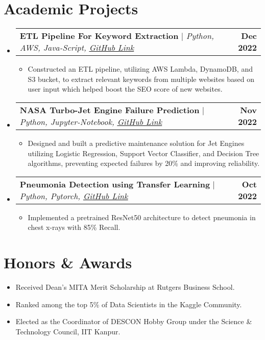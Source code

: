 \documentclass[letterpaper,11pt]{article}
\makeatletter
\newcommand{\resumeItem}[1]{
  \item\small{
    {#1 \vspace{-2pt}}
  }
}
\newcommand{\resumeProjectHeading}[2]{
    \item
    \begin{tabular*}{1.001\textwidth}{l@{\extracolsep{\fill}}r}
      \small#1 & \textbf{\small #2}\\
    \end{tabular*}\vspace{-7pt}
}
\newcommand{\resumeSubHeadingListStart}{\begin{itemize}[leftmargin=0.0in, label={}]}
\newcommand{\resumeSubHeadingListEnd}{\end{itemize}}
\newcommand{\resumeItemListStart}{\begin{itemize}}
\newcommand{\resumeItemListEnd}{\end{itemize}\vspace{-2pt}}
\makeatother
\begin{document}
\section{Academic Projects}
    \vspace{-5pt}
    \resumeSubHeadingListStart
    \resumeProjectHeading 
         {\textbf{ETL Pipeline For Keyword Extraction} $|$ \emph{Python, AWS, Java-Script, \href{https://github.com/Sha661nk/ETL-Pipeline-for-Keyword-Extraction} {\color{blue}\underline{GitHub Link}}}}{Dec 2022}
          \resumeItemListStart
            \resumeItem{Constructed an ETL pipeline, utilizing AWS Lambda, DynamoDB, and S3 bucket, to extract relevant keywords from multiple websites based on user input which helped boost the SEO score of new websites.}
          \resumeItemListEnd
    \vspace{-21pt}
    \resumeProjectHeading
        {\textbf{NASA Turbo-Jet Engine Failure Prediction} $|$ \emph{Python, Jupyter-Notebook, \href{https://github.com/Sha661nk/NASA-Jet-Engine-Failure-Prediction} {\color{blue}\underline{GitHub Link}}}}{Nov 2022}
          \resumeItemListStart
            \resumeItem{Designed and built a predictive maintenance solution for Jet Engines utilizing Logistic Regression, Support Vector Classifier, and Decision Tree algorithms, preventing expected failures by 20\% and improving reliability.}
          \resumeItemListEnd 
        
     \vspace{-23pt}
     \resumeProjectHeading
          {\textbf{Pneumonia Detection using Transfer Learning} $|$ \emph{Python, Pytorch, \href{https://github.com/Sha661nk/Pneumonia-Detection} {\color{blue}\underline{GitHub Link}}}} {Oct 2022}
          \resumeItemListStart
            \resumeItem{Implemented a pretrained ResNet50 architecture to detect pneumonia in chest x-rays with 85\% Recall.}
          \resumeItemListEnd
    \resumeSubHeadingListEnd
\vspace{-15pt}

\section{Honors \& Awards}
            \resumeItemListStart
                \resumeItem{Received Dean’s MITA Merit Scholarship at Rutgers Business School.}
                \vspace{-2.0mm}
                \resumeItem{Ranked among the top 5\% of Data Scientists in the Kaggle Community.}
                \vspace{-2.0mm}
                \resumeItem{Elected as the Coordinator of DESCON Hobby Group under the Science \& Technology Council, IIT Kanpur.}
            \resumeItemListEnd
\end{document}
